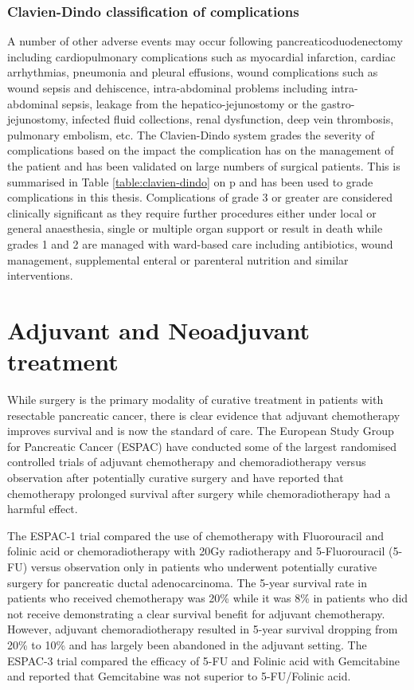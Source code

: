 \subsubsection{Clavien-Dindo classification of complications}

A number of other adverse events may occur following pancreaticoduodenectomy including cardiopulmonary complications such as myocardial infarction, cardiac arrhythmias, pneumonia and pleural effusions, wound complications such as wound sepsis and dehiscence, intra-abdominal problems including intra-abdominal sepsis, leakage from the hepatico-jejunostomy or the gastro-jejunostomy, infected fluid collections, renal dysfunction, deep vein thrombosis, pulmonary embolism, etc. The Clavien-Dindo system grades the severity of complications based on the impact the complication has on the management of the patient and has been validated on large numbers of surgical patients.\parencite{clavien_clavien-dindo_2009, dindo_classification_2004} This is summarised in Table \ref{table:clavien-dindo} on p\pageref{table:clavien-dindo} and has been used to grade complications in this thesis. Complications of grade 3 or greater are considered clinically significant as they require further procedures either under local or general anaesthesia, single or multiple organ support or result in death while grades 1 and 2 are managed with ward-based care including antibiotics, wound management, supplemental enteral or parenteral nutrition and similar interventions.

\section{Adjuvant and Neoadjuvant treatment}

While surgery is the primary modality of curative treatment in patients with resectable pancreatic cancer, there is clear evidence that adjuvant chemotherapy improves survival and is now the standard of care. The European Study Group for Pancreatic Cancer (ESPAC) have conducted some of the largest randomised controlled trials of adjuvant chemotherapy and chemoradiotherapy versus observation after potentially curative surgery and have reported that chemotherapy prolonged survival after surgery while chemoradiotherapy had a harmful effect. \parencite{neoptolemos_adjuvant_2001, neoptolemos_randomized_2004, neoptolemos_adjuvant_2009, neoptolemos_adjuvant_2010} 

The ESPAC-1 trial compared the use of chemotherapy with Fluorouracil and folinic acid or chemoradiotherapy with 20Gy radiotherapy and 5-Fluorouracil (5-FU) versus observation only in patients who underwent potentially curative surgery for pancreatic ductal adenocarcinoma. The 5-year survival rate in patients who received chemotherapy was 20\% while it was 8\% in patients who did not receive demonstrating a clear survival benefit for adjuvant chemotherapy. However, adjuvant chemoradiotherapy resulted in 5-year survival dropping from 20\% to 10\% and has largely been abandoned in the adjuvant setting. The ESPAC-3 trial compared the efficacy of 5-FU and Folinic acid with Gemcitabine and reported that Gemcitabine was not superior to 5-FU/Folinic acid.

